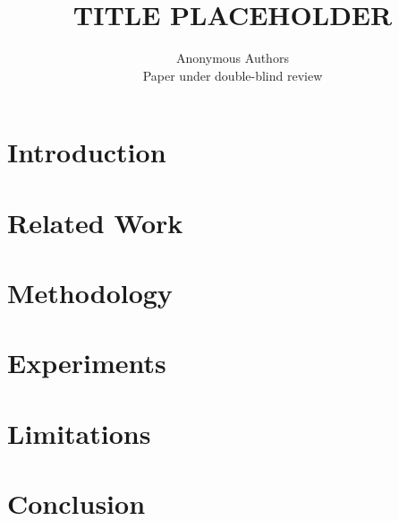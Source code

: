\documentclass[10pt,twocolumn]{article}
\title{TITLE PLACEHOLDER}
\author{Anonymous Authors\\
Paper under double-blind review}
\begin{document}
\maketitle

\begin{abstract}
\end{abstract}

\section{Introduction}
\label{sec:intro}

\section{Related Work}
\label{sec:related_work}

\section{Methodology}
\label{sec:method}

\section{Experiments}
\label{sec:experiments}

\section{Limitations}
\label{sec:limitations}

\section{Conclusion}
\label{sec:conclusion}

{\small


}

\clearpage
\appendix
\end{document}
